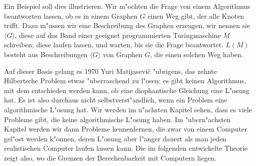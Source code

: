 Ein Beispiel soll dies illustrieren. Wir m"ochten die Frage
von einem Algorithmus beantworten lassen, ob es in einem Graphen $G$
einen Weg gibt, der alle Knoten trifft.  Dazu m"ussen wir eine
Beschreibung des Graphen erzeugen, wir nennen sie $\langle G\rangle$,
diese auf das Band einer geeignet programmierten Turingmaschine $M$ schreiben,
diese laufen lassen, und warten, bis sie die Frage beantwortet. $L(M)$
besteht aus Beschreibungen $\langle G\rangle$ von Graphen $G$, die
einen solchen Weg haben.

Auf dieser Basis gelang es 1970 Yuri Matijasevi\v c "ubrigens,
das zehnte Hilbertsche Problem etwas "uberraschend zu l"osen: es gibt
keinen Algorithmus, mit dem entschieden werden kann, ob eine
diophantische Gleichung eine L"osung hat. Es ist also durchaus
nicht selbstverst"andlich, wenn ein Problem eine algorithmische
L"osung hat. Wir werden im n"achsten Kapitel sehen, dass es viele
Probleme gibt, die keine algorithmische L"osung haben. Im "ubern"achsten
Kapitel werden wir dann Probleme kennenlernen, die zwar von einem Computer
gel"ost werden k"onnen, deren L"osung aber l"anger dauert als man
jeden realistischen Computer laufen lassen kann.
Die im folgenden entwickelte Theorie zeigt also, wo die Grenzen
der Berechenbarkeit mit Computern liegen.
